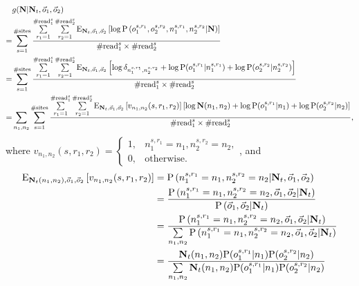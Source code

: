 \documentclass{article}
\begin{document}
\begin{align}
&g({\bf N}|{\bf N}_t,\vec{o}_1,\vec{o}_2)\nonumber\\
    =&\sum_{s=1}^{\#\mathrm{sites}}\frac{\sum\limits_{r_1=1}^{\#\mathrm{read}_1^s}\sum\limits_{r_2=1}^{\#\mathrm{read}_2^s}\mathrm{E}_{{\bf N}_t,\vec{o}_1,\vec{o}_2}\left[\log\mathrm{P}\left(o_1^{s,r_1},o_2^{s,r_2},n_1^{s,r_1},n_2^{s,r_2}|{\bf N}\right)\right]}{\#\mathrm{read}_1^s\times\#\mathrm{read}_2^s}\nonumber\\
=&\sum_{s=1}^{\#\mathrm{sites}}\frac{\sum\limits_{r_1=1}^{\#\mathrm{read}_1^s}\sum\limits_{r_2=1}^{\#\mathrm{read}_2^s}\mathrm{E}_{{\bf N}_t,\vec{o}_1,\vec{o}_2}\left[\log\delta_{n_1^{s,r_1},n_2^{s,r_2}}+\log\mathrm{P}(o_1^{s,r_1}|n_1^{s,r_1})+\log\mathrm{P}(o_2^{s,r_2}|n_2^{s,r_2})\right]}{\#\mathrm{read}_1^s\times\#\mathrm{read}_2^s}\nonumber\\
=&\sum_{n_1,n_2}\sum_{s=1}^{\#\mathrm{sites}}\frac{\sum\limits_{r_1=1}^{\#\mathrm{read}_1^s}\sum\limits_{r_2=1}^{\#\mathrm{read}_2^s}\mathrm{E}_{{\bf N}_t,\vec{o}_1,\vec{o}_2}\left[v_{n_1,n_2}(s,r_1,r_2)\right]\left[\log{\bf N}(n_1,n_2)+\log\mathrm{P}(o_1^{s,r_1}|n_1)+\log\mathrm{P}(o_2^{s,r_2}|n_2)\right]}{\#\mathrm{read}_1^s\times\#\mathrm{read}_2^s},\label{eq:distAngsd-nucEStep}
\end{align}
where $v_{n_1,n_2}(s,r_1,r_2)=\left\{\begin{array}{cc}
   1,  & n_1^{s,r_1}=n_1, n_2^{s,r_2}=n_2,\\
   0,  & \mathrm{otherwise}.
\end{array}\right.$, and
\begin{align*}
    \mathrm{E}_{{\bf N}_t(n_1,n_2),\vec{o}_1,\vec{o}_2}\left[v_{n_1,n_2}(s,r_1,r_2)\right]&=\mathrm{P}\left(n_1^{s,r_1}=n_1, n_2^{s,r_2}=n_2|{\bf N}_t,\vec{o}_1,\vec{o}_2\right)\\
    &=\frac{\mathrm{P}\left(n_1^{s,r_1}=n_1, n_2^{s,r_2}=n_2,\vec{o}_1,\vec{o}_2|{\bf N}_t\right)}{\mathrm{P}\left(\vec{o}_1,\vec{o}_2|{\bf N}_t\right)}\\
     &=\frac{\mathrm{P}\left(n_1^{s,r_1}=n_1, n_2^{s,r_2}=n_2,\vec{o}_1,\vec{o}_2|{\bf N}_t\right)}{\sum\limits_{n_1,n_2}\mathrm{P}\left(n_1^{s,r_1}=n_1, n_2^{s,r_2}=n_2,\vec{o}_1,\vec{o}_2|{\bf N}_t\right)}\\
    &=\frac{{\bf N}_t(n_1,n_2)\mathrm{P}(o_1^{s,r_1}|n_1)\mathrm{P}(o_2^{s,r_2}|n_2)}{\sum\limits_{n_1,n_2}{\bf N}_t(n_1,n_2)\mathrm{P}(o_1^{s,r_1}|n_1)\mathrm{P}(o_2^{s,r_2}|n_2)}
\end{align*}
\end{document}

